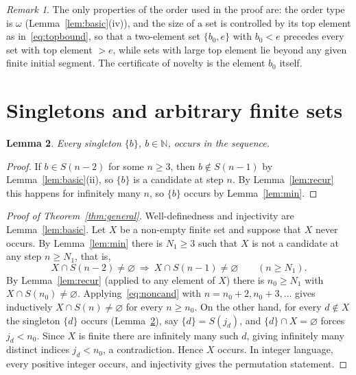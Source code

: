 \documentclass[11pt]{amsart}
\newtheorem{lemma}{Lemma}[section]
\theoremstyle{definition}
\theoremstyle{remark}
\newtheorem{remark}[lemma]{Remark}
\newcommand{\N}{\mathbb{N}}
\begin{document}
\begin{remark}
The only properties of the order used in the proof are: the order type is $\omega$
(Lemma~\ref{lem:basic}(iv)), and the size of a set is controlled by its top element as
in~\eqref{eq:topbound}, so that a two-element set $\{b_0,e\}$ with $b_0<e$ precedes every set
with top element $>e$, while sets with large top element lie beyond any given finite initial
segment. The certificate of novelty is the element $b_0$ itself.
\end{remark}

\section{Singletons and arbitrary finite sets}\label{sec:proof}

\begin{lemma}\label{lem:singletons}
Every singleton $\{b\}$, $b\in\N$, occurs in the sequence.
\end{lemma}

\begin{proof}
If $b\in S(n-2)$ for some $n\ge3$, then $b\notin S(n-1)$ by Lemma~\ref{lem:basic}(ii), so
$\{b\}$ is a candidate at step $n$. By Lemma~\ref{lem:recur} this happens for infinitely many
$n$, so $\{b\}$ occurs by Lemma~\ref{lem:min}.
\end{proof}

\begin{proof}[Proof of Theorem~\ref{thm:general}]
Well-definedness and injectivity are Lemma~\ref{lem:basic}. Let $X$ be a non-empty finite set and
suppose that $X$ never occurs. By Lemma~\ref{lem:min} there is $N_1\ge3$ such that $X$ is not a
candidate at any step $n\ge N_1$, that is,
\begin{equation}\label{eq:noncand}
X\cap S(n-2)\neq\varnothing\ \Longrightarrow\ X\cap S(n-1)\neq\varnothing\qquad(n\ge N_1).
\end{equation}
By Lemma~\ref{lem:recur} (applied to any element of $X$) there is $n_0\ge N_1$ with
$X\cap S(n_0)\neq\varnothing$. Applying~\eqref{eq:noncand} with $n=n_0+2,n_0+3,\dots$ gives
inductively $X\cap S(n)\neq\varnothing$ for every $n\ge n_0$. On the other hand, for every
$d\notin X$ the singleton $\{d\}$ occurs (Lemma~\ref{lem:singletons}), say $\{d\}=S(j_d)$, and
$\{d\}\cap X=\varnothing$ forces $j_d<n_0$. Since $X$ is finite there are infinitely many such
$d$, giving infinitely many distinct indices $j_d<n_0$, a contradiction. Hence $X$ occurs. In
integer language, every positive integer occurs, and injectivity gives the permutation statement.
\end{proof}
\end{document}
